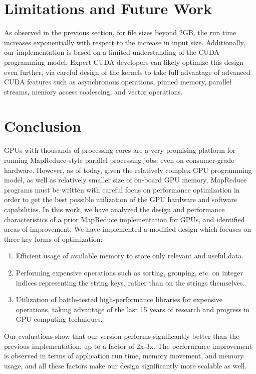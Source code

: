 \documentclass{article}
\begin{document}
\section{Limitations and Future Work}
As observed in the previous section, for file sizes beyond 2GB, the run time increases exponentially with respect to the increase in input size. Additionally, our implementation is based on a limited understanding of the CUDA programming model. Expert CUDA developers can likely optimize this design even further, via careful design of the kernels to take full advantage of advanced CUDA features such as asynchronous operations, pinned memory, parallel streams, memory access coalescing, and vector operations.

\section{Conclusion}
GPUs with thousands of processing cores are a very promising platform for running MapReduce-style parallel processing jobs, even on consumer-grade hardware. However, as of today, given the relatively complex GPU programming model, as well as relatively smaller size of on-board GPU memory, MapReduce programs must be written with careful focus on performance optimization in order to get the best possible utilization of the GPU hardware and software capabilities. In this work, we have analyzed the design and performance characteristics of a prior MapReduce implementation for GPUs, and identified areas of improvement. We have implemented a modified design which focuses on three key forms of optimization:

\begin{enumerate}
    \item Efficient usage of available memory to store only relevant and useful data.
    \item Performing expensive operations such as sorting, grouping, etc. on integer indices representing the string keys, rather than on the strings themselves.
    \item Utilization of battle-tested high-performance libraries for expensive operations, taking advantage of the last 15 years of research and progress in GPU computing techniques.
\end{enumerate}

Our evaluations show that our version performs significantly better than the previous implementation, up to a factor of 2x-3x. The performance improvement is observed in terms of application run time, memory movement, and memory usage, and all these factors make our design significantly more scalable as well. 
\end{document}

